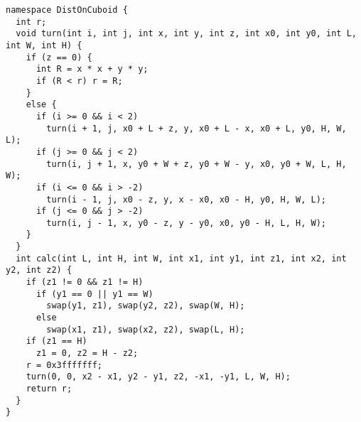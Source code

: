 \begin{lstlisting}
namespace DistOnCuboid {
  int r;
  void turn(int i, int j, int x, int y, int z, int x0, int y0, int L, int W, int H) {
    if (z == 0) {
      int R = x * x + y * y;
      if (R < r) r = R;
    }
    else {
      if (i >= 0 && i < 2)
        turn(i + 1, j, x0 + L + z, y, x0 + L - x, x0 + L, y0, H, W, L);
      if (j >= 0 && j < 2)
        turn(i, j + 1, x, y0 + W + z, y0 + W - y, x0, y0 + W, L, H, W);
      if (i <= 0 && i > -2)
        turn(i - 1, j, x0 - z, y, x - x0, x0 - H, y0, H, W, L);
      if (j <= 0 && j > -2)
        turn(i, j - 1, x, y0 - z, y - y0, x0, y0 - H, L, H, W);
    }
  }
  int calc(int L, int H, int W, int x1, int y1, int z1, int x2, int y2, int z2) {
    if (z1 != 0 && z1 != H)
      if (y1 == 0 || y1 == W)
        swap(y1, z1), swap(y2, z2), swap(W, H);
      else
        swap(x1, z1), swap(x2, z2), swap(L, H);
    if (z1 == H)
      z1 = 0, z2 = H - z2;
    r = 0x3fffffff;
    turn(0, 0, x2 - x1, y2 - y1, z2, -x1, -y1, L, W, H);
    return r;
  }
}

\end{lstlisting}